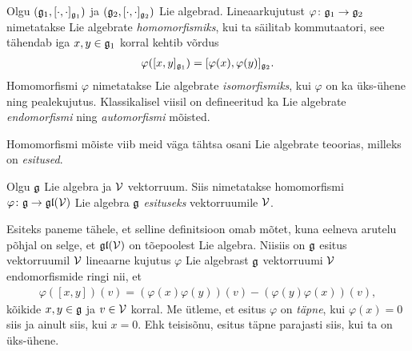 Olgu $(\mathfrak{g}_1, [\cdot, \cdot]_{\mathfrak{g}_1})$ ja $(\mathfrak{g}_2, [\cdot, \cdot]_{\mathfrak{g}_2})$ Lie
algebrad. Lineaarkujutust $\varphi \colon \mathfrak{g}_1 \to \mathfrak{g}_2$ nimetatakse
Lie algebrate \emph{homomorfismiks}, kui ta säilitab kommutaatori, see
tähendab iga $x, y \in \mathfrak{g}_1$ korral kehtib võrdus
\begin{align*}
    \varphi([x, y]_{\mathfrak{g}_1}) = [\varphi(x), \varphi(y)]_{\mathfrak{g}_2}.
\end{align*}
Homomorfismi $\varphi$ nimetatakse Lie algebrate \emph{isomorfismiks},
kui $\varphi$ on ka üks-ühene ning pealekujutus. Klassikalisel viisil on
defineeritud ka Lie algebrate \emph{endomorfismi} ning \emph{automorfismi}
mõisted.

Homomorfismi mõiste viib meid väga tähtsa osani Lie algebrate teoorias,
milleks on \emph{esitused}.

\begin{dfn}
    Olgu $\mathfrak{g}$ Lie algebra ja $\mathcal{V}$ vektorruum. Siis nimetatakse homomorfismi
    $\varphi \colon \mathfrak{g} \to \mathfrak{gl}(\mathcal{V})$ Lie algebra $\mathfrak{g}$ \emph{esituseks}
    vektorruumile $\mathcal{V}$.
\end{dfn}

Esiteks paneme tähele, et selline definitsioon omab mõtet, kuna
eelneva arutelu põhjal on selge, et $\mathfrak{gl}(\mathcal{V})$ on tõepoolest Lie algebra.
Niisiis on $\mathfrak{g}$ esitus vektorruumil $\mathcal{V}$ lineaarne kujutus $\varphi$
Lie algebrast $\mathfrak{g}$ vektorruumi $\mathcal{V}$ endomorfismide ringi nii, et
\begin{align*}
    \varphi([x, y])(v) = \left( \varphi(x)\varphi(y) \right) (v) -
                         \left( \varphi(y)\varphi(x) \right) (v),
\end{align*}
kõikide $x, y \in \mathfrak{g}$ ja $v \in \mathcal{V}$ korral. Me ütleme, et esitus $\varphi$
on \emph{täpne}, kui $\varphi(x) = 0$ siis ja ainult siis, kui $x = 0$. Ehk
teisisõnu, esitus täpne parajasti siis, kui ta on üks-ühene.

